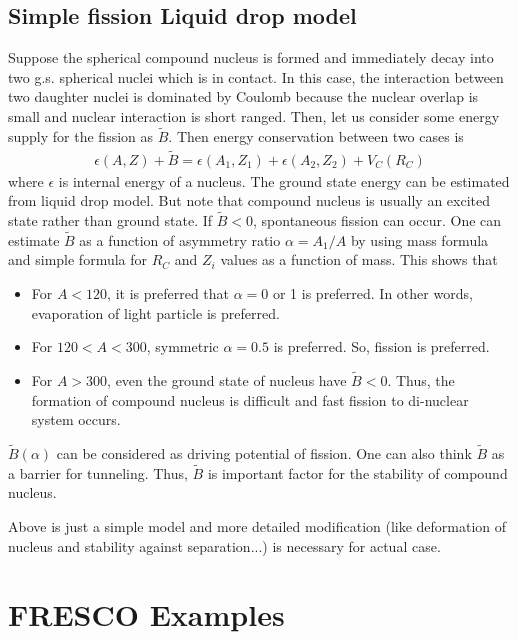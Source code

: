 \documentclass[11pt]{book}
\newcommand{\bea}{\begin{eqnarray}}
\newcommand{\eea}{\end{eqnarray}}
\begin{document}
\section{Simple fission Liquid drop model}
Suppose the spherical compound nucleus is formed and immediately decay into 
two g.s. spherical nuclei which is in contact. 
In this case, the interaction between two daughter nuclei is dominated by Coulomb 
because the nuclear overlap is small and nuclear interaction is short ranged. 
Then, let us consider some energy supply for the fission as $\tilde{B}$. 
Then energy conservation between two cases is 
\bea 
\epsilon(A,Z) +\tilde{B} = \epsilon(A_1,Z_1)+\epsilon(A_2,Z_2)+V_C(R_C)
\eea 
where $\epsilon$ is internal energy of a nucleus.
The ground state energy can be estimated from liquid drop model.
But note that compound nucleus is usually an excited state rather than ground state. 
If $\tilde{B}<0$, spontaneous fission can occur. 
One can estimate $\tilde{B}$ as a function of asymmetry ratio $\alpha=A_1/A$ 
by using mass formula and simple formula for $R_C$ and $Z_i$ values as a 
function of mass. 
This shows that 
\begin{itemize}
	\item For $A<120$, it is preferred that $\alpha=0$ or 1 is preferred. In other words,
	       evaporation of light particle is preferred.
	\item For $120<A<300$, symmetric $\alpha=0.5$ is preferred. So, fission is preferred.
	\item For $A>300$, even the ground state of nucleus have $\tilde{B}<0$. 
	      Thus, the formation of compound nucleus is difficult and
	      fast fission to di-nuclear system occurs.        
\end{itemize}

$\tilde{B}(\alpha)$ can be considered as driving potential of fission. 
One can also think $\tilde{B}$ as a barrier for tunneling. Thus,
$\tilde{B}$ is important factor for the stability of compound nucleus. 

Above is just a simple model and more detailed modification 
(like deformation of nucleus and stability against separation...)
is necessary for actual case. 






\chapter{FRESCO Examples}
\end{document}
